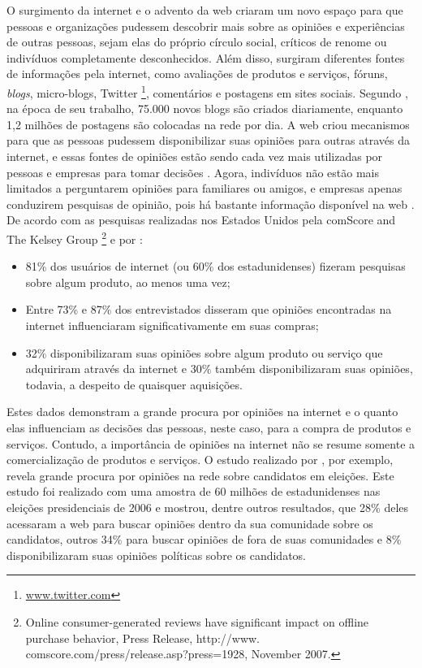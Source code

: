 \documentclass[template.tex]{subfiles}
\begin{document}
O surgimento da internet e o advento da web criaram um novo espaço para que pessoas e organizações pudessem descobrir mais sobre as opiniões e experiências de outras pessoas, sejam elas do próprio círculo social, críticos de renome ou indivíduos completamente desconhecidos. Além disso, surgiram diferentes fontes de informações pela internet, como avaliações de produtos e serviços, fóruns, \textit{blogs}, micro-blogs, Twitter \footnote{\url{www.twitter.com}}, comentários e postagens em sites sociais. Segundo , na época de seu trabalho, 75.000 novos blogs são criados diariamente, enquanto 1,2 milhões de postagens são colocadas na rede por dia.  A web criou mecanismos para que as pessoas pudessem disponibilizar suas opiniões para outras através da internet, e essas fontes de opiniões estão sendo cada vez mais utilizadas por pessoas e empresas para tomar decisões \cite{bing:2012, pang:2008}. Agora, indivíduos não estão mais limitados a perguntarem opiniões para familiares ou amigos, e empresas apenas conduzirem pesquisas de opinião, pois há bastante informação disponível na web \cite{bing:2012}. De acordo com as pesquisas realizadas nos Estados Unidos pela comScore and The Kelsey Group \footnote{Online consumer-generated reviews have significant impact on offline purchase behavior, Press Release, http://www. comscore.com/press/release.asp?press=1928, November 2007.} e por :

\begin{itemize}
\item 81\% dos usuários de internet (ou 60\% dos estadunidenses) fizeram pesquisas sobre algum produto, ao menos uma vez;
\item Entre 73\% e 87\% dos entrevistados disseram que opiniões encontradas na internet influenciaram significativamente em suas compras;
\item 32\% disponibilizaram suas opiniões sobre algum produto ou serviço que adquiriram através da internet e 30\% também disponibilizaram suas opiniões, todavia, a despeito de quaisquer aquisições.

\end{itemize}

Estes dados demonstram a grande procura por opiniões na internet e o quanto elas influenciam as decisões das pessoas, neste caso, para a compra de produtos e serviços. Contudo, a importância de opiniões na internet não se resume somente a comercialização de produtos e serviços. O estudo realizado por , por exemplo, revela grande procura por opiniões na rede sobre candidatos em eleições. Este estudo foi realizado com uma amostra de 60 milhões de estadunidenses nas eleições presidenciais de 2006 e mostrou, dentre outros resultados, que 28\% deles acessaram a web para buscar opiniões dentro da sua comunidade sobre os candidatos, outros 34\% para buscar opiniões de fora de suas comunidades e 8\% disponibilizaram suas opiniões políticas sobre os candidatos. 
\end{document}
